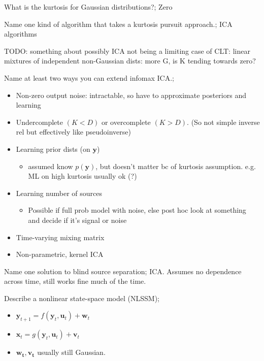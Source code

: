 \documentclass{article}
\begin{document}
What is the kurtosis for Gaussian distributions?; Zero

Name one kind of algorithm that takes a kurtosis pursuit approach.; ICA algorithms

TODO: something about possibly ICA not being a limiting case of CLT: linear mixtures of independent non-Gaussian dists: more G, is K tending towards zero?

Name at least two ways you can extend infomax ICA.; \begin{itemize} \item Non-zero output noise: intractable, so have to approximate posteriors and learning \item Undercomplete $(K<D)$ or overcomplete $(K>D)$. (So not simple inverse rel but effectively like pseudoinverse) \item Learning prior dists (on $\mathbf{y}$) \begin{itemize} \item assumed know $p(\mathbf{y})$, but doesn't matter bc of kurtosis assumption. e.g. ML on high kurtosis usually ok (?) \end{itemize} \item Learning number of sources \begin{itemize} \item Possible if full prob model with noise, else post hoc look at something and decide if it's signal or noise \end{itemize} \item Time-varying mixing matrix \item Non-parametric, kernel ICA \end{itemize}

Name one solution to blind source separation; ICA. Assumes no dependence across time, still works fine much of the time.

Describe a nonlinear state-space model (NLSSM); \begin{itemize} \item $\mathbf{y}_{t+1}=f(\mathbf{y}_t, \mathbf{u}_t)+\mathbf{w}_t$ \item $\mathbf{x}_t=g(\mathbf{y}_t, \mathbf{u}_t)+\mathbf{v}_t$ \item $\mathbf{w_t, v_t}$ usually still Gaussian. \end{itemize}
\end{document}
